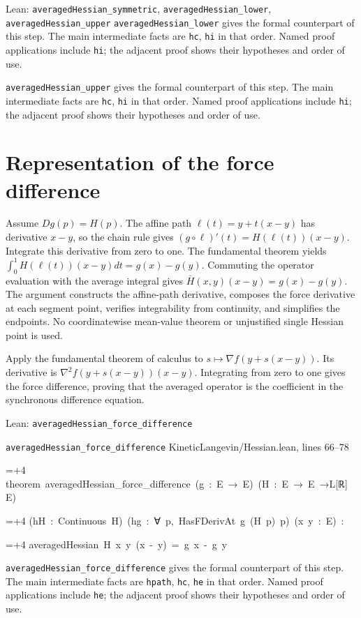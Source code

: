 \documentclass[11pt,a4paper]{article}
\newlength{\leancharwidth}
\newenvironment{leancode}{\par\smallskip\begingroup\ttfamily\footnotesize\raggedright
  \settowidth{\leancharwidth}{M}\setlength{\parskip}{0pt}\setlength{\parindent}{0pt}
  \frenchspacing}{\par\endgroup\smallskip}
\newcommand{\leanline}[2]{\hangindent=\dimexpr#1\leancharwidth+4\leancharwidth\relax
  \hangafter=1\noindent\hspace*{#1\leancharwidth}#2\par}
\newcommand{\leansource}[1]{\par{\footnotesize\color{leanmuted}#1}\par}
\newcommand{\leanlabel}[1]{\par\smallskip\noindent{\small\bfseries #1}\par}
\begin{document}
\begin{leanbox}{Lean: \texttt{averagedHessian\_\allowbreak{}symmetric}, \texttt{averagedHessian\_\allowbreak{}lower}, \texttt{averagedHessian\_\allowbreak{}upper}}
\texttt{averaged\allowbreak{}Hessian\_\allowbreak{}lower} gives the formal counterpart of this step. The main intermediate facts are \texttt{hc}, \texttt{hi} in that order. Named proof applications include \texttt{hi}; the adjacent proof shows their hypotheses and order of use.




\texttt{averaged\allowbreak{}Hessian\_\allowbreak{}upper} gives the formal counterpart of this step. The main intermediate facts are \texttt{hc}, \texttt{hi} in that order. Named proof applications include \texttt{hi}; the adjacent proof shows their hypotheses and order of use.
\end{leanbox}

\section{\texorpdfstring{Representation of the force difference}{Representation of the force difference}}


Assume \(Dg(p)=H(p)\). The affine path \(\ell(t)=y+t(x-y)\) has derivative \(x-y\), so the chain rule gives \((g\circ\ell)'(t)=H(\ell(t))(x-y)\). Integrate this derivative from zero to one. The fundamental theorem yields \(\int_0^1H(\ell(t))(x-y)dt=g(x)-g(y)\). Commuting the operator evaluation with the average integral gives \(\bar H(x,y)(x-y)=g(x)-g(y)\). The argument constructs the affine-path derivative, composes the force derivative at each segment point, verifies integrability from continuity, and simplifies the endpoints. No coordinatewise mean-value theorem or unjustified single Hessian point is used.



Apply the fundamental theorem of calculus to \(s\mapsto\nabla f(y+s(x-y))\). Its derivative is \(\nabla^2f(y+s(x-y))(x-y)\). Integrating from zero to one gives the force difference, proving that the averaged operator is the coefficient in the synchronous difference equation.

\begin{leanbox}{Lean: \texttt{averagedHessian\_\allowbreak{}force\_\allowbreak{}difference}}
\leansource{\texttt{averagedHessian\_\allowbreak{}force\_\allowbreak{}difference} \quad KineticLangevin/\allowbreak{}Hessian.lean, lines 66–78}
\begin{leancode}
\leanline{0}{theorem\ averagedHessian\_force\_difference\ (g\ :\ E\ →\ E)\ (H\ :\ E\ →\ E\ →L[ℝ]\ E)}
\leanline{4}{(hH\ :\ Continuous\ H)\ (hg\ :\ ∀\ p,\ HasFDerivAt\ g\ (H\ p)\ p)\ (x\ y\ :\ E)\ :}
\leanline{4}{averagedHessian\ H\ x\ y\ (x\ -\ y)\ =\ g\ x\ -\ g\ y}
\end{leancode}
\leanlabel{How the Lean proof follows the argument}
\texttt{averaged\allowbreak{}Hessian\_\allowbreak{}force\_\allowbreak{}difference} gives the formal counterpart of this step. The main intermediate facts are \texttt{hpath}, \texttt{hc}, \texttt{he} in that order. Named proof applications include \texttt{he}; the adjacent proof shows their hypotheses and order of use.
\end{leanbox}
\end{document}

